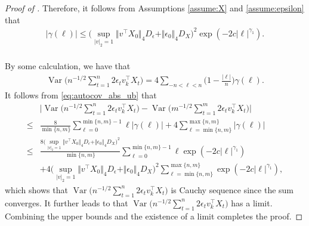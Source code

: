 \documentclass[11pt]{article}
\DeclareMathOperator*{\var}{Var}
\theoremstyle{plain}
\theoremstyle{definition}
\begin{document}
\begin{proof}[Proof of ]
Therefore, it follows from Assumptions \ref{assume:X} and \ref{assume:epsilon} that
\begin{align}\label{eq:autocov_abs_ub}
    \big|\gamma(\ell)\big| \leq \Big(\sup_{|v|_2 = 1}\big\Vert v^{\top} X_0 \big\Vert_4D_{\epsilon} + \Vert \epsilon_0 \Vert_4D_{X}\Big)^2\exp(-2c|\ell|^{\gamma_1}).
\end{align}
\
\\
By some calculation, we have that
\begin{align*}
    \var\bigg(n^{-1/2}\sum_{t = 1}^n 2\epsilon_t v_k^{\top}X_t\bigg) = 4\sum_{-n < \ell < n}\Big(1- \frac{|\ell|}{n}\Big)\gamma(\ell).
\end{align*}
It follows from \eqref{eq:autocov_abs_ub} that
\begin{align*}
    &\bigg|\var\bigg(n^{-1/2}\sum_{t = 1}^n 2\epsilon_t v_k^{\top}X_t\bigg) - \var\bigg(m^{-1/2}\sum_{t = 1}^m 2\epsilon_t v_k^{\top}X_t\bigg)\bigg|\\
    \leq& \frac{8}{\min\{n,m\}}\sum_{\ell = 0}^{\min\{n,m\}-1}\ell|\gamma(\ell)| + 4\sum_{\ell = \min\{n,m\}}^{\max\{n,m\}}|\gamma(\ell)|\\
    \leq& \frac{8\Big(\sup_{|v|_2 = 1}\big\Vert v^{\top} X_0 \big\Vert_4D_{\epsilon} + \Vert \epsilon_0 \Vert_4D_{X}\Big)^2}{\min\{n,m\}}\sum_{\ell = 0}^{\min\{n,m\}-1}\ell\exp(-2c|\ell|^{\gamma_1})\\
    &+ 4\Big(\sup_{|v|_2 = 1}\big\Vert v^{\top} X_0 \big\Vert_4D_{\epsilon} + \Vert \epsilon_0 \Vert_4D_{X}\Big)^2\sum_{\ell = \min\{n,m\}}^{\max\{n,m\}}\exp(-2c|\ell|^{\gamma_1}),
\end{align*}
which shows that $\var\big(n^{-1/2}\sum_{t = 1}^n 2\epsilon_t v_k^{\top}X_t\big)$ is Cauchy sequence since the sum converges. It further leads to that $\var\big(n^{-1/2}\sum_{t = 1}^n2 \epsilon_t v_k^{\top}X_t\big)$ has a limit.
Combining the upper bounds and the existence of a limit completes the proof.
\end{proof}
\end{document}
